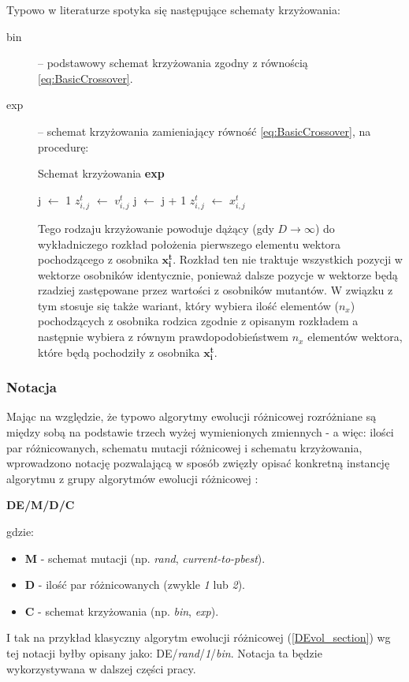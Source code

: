 \documentclass[12pt,a4paper]{report}
\begin{document}
{{{\par{
Typowo w literaturze spotyka się następujące schematy krzyżowania:
\begin{description}
\item[bin] -- podstawowy schemat krzyżowania zgodny z równością \ref{eq:BasicCrossover}.
\item[exp] -- schemat krzyżowania zamieniający równość \ref{eq:BasicCrossover}, na procedurę:
\begin{algorithm}[H]
\caption{Schemat krzyżowania \textbf{exp}}
\label{algorithm:ea}
\begin{algorithmic}[1]
\State j $\gets$ 1
	\State $z_{i,j}^t$ $\gets$ $v_{i,j}^t$
	\State j $\gets$ j + 1
\EndWhile
{}
	\State $z_{i,j}^t$ $\gets$ $x_{i,j}^t$
\EndWhile
\end{algorithmic}
\end{algorithm}

Tego rodzaju krzyżowanie powoduje dążący (gdy $D \rightarrow \infty$) do wykładniczego rozkład położenia pierwszego elementu wektora pochodzącego z osobnika $\mathbf{x_i^t}$. Rozkład ten nie traktuje wszystkich pozycji w wektorze osobników identycznie, ponieważ dalsze pozycje w wektorze będą rzadziej zastępowane przez wartości z osobników mutantów. W związku z tym stosuje się także wariant, który wybiera ilość elementów ($n_x$) pochodzących z osobnika rodzica zgodnie z opisanym rozkładem a następnie wybiera z równym prawdopodobieństwem $n_x$ elementów wektora, które będą pochodziły z osobnika $\mathbf{x_i^t}$.
\end{description}
}
\subsubsection{Notacja}
\par{
Mając na względzie, że typowo algorytmy ewolucji różnicowej rozróżniane są między sobą na podstawie trzech wyżej wymienionych zmiennych - a więc: ilości par różnicowanych, schematu mutacji różnicowej i schematu krzyżowania, wprowadzono notację pozwalającą w sposób zwięzły opisać konkretną instancję algorytmu z grupy algorytmów ewolucji różnicowej \cite{PracticalInsights}:
\begin{center}
\textbf{DE/M/D/C}
\end{center}
gdzie:
\begin{itemize}
\item \textbf{M} - schemat mutacji (np. \emph{rand}, \emph{current-to-pbest}).
\item \textbf{D} - ilość par różnicowanych (zwykle \emph{1} lub \emph{2}).
\item \textbf{C} - schemat krzyżowania (np. \emph{bin}, \emph{exp}).
\end{itemize}
I tak na przykład klasyczny algorytm ewolucji różnicowej (\ref{DEvol_section}) wg tej notacji byłby opisany jako: DE/\emph{rand}/\emph{1}/\emph{bin}. Notacja ta będzie wykorzystywana w dalszej części pracy.
}


}}}
\end{document}
